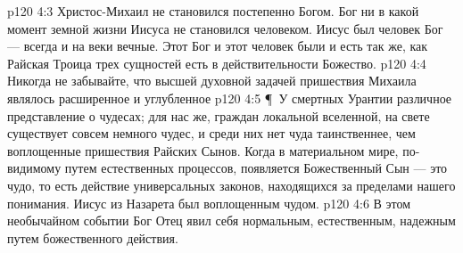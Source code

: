 \vs p120 4:3 Христос\hyp{}Михаил не становился постепенно Богом. Бог ни в какой момент земной жизни Иисуса не становился человеком. Иисус был человек  Бог --- всегда и на веки вечные. Этот Бог и этот человек были и есть  так же, как Райская Троица трех сущностей есть в действительности  Божество.
\vs p120 4:4 Никогда не забывайте, что высшей духовной задачей пришествия Михаила являлось расширенное и углубленное 
\vs p120 4:5 \P\ У смертных Урантии различное представление о чудесах; для нас же, граждан локальной вселенной, на свете существует совсем немного чудес, и среди них нет чуда таинственнее, чем воплощенные пришествия Райских Сынов. Когда в материальном мире, по\hyp{}видимому путем естественных процессов, появляется Божественный Сын --- это чудо, то есть действие универсальных законов, находящихся за пределами нашего понимания. Иисус из Назарета был воплощенным чудом.
\vs p120 4:6 В этом необычайном событии Бог Отец явил себя  нормальным, естественным, надежным путем божественного действия.
